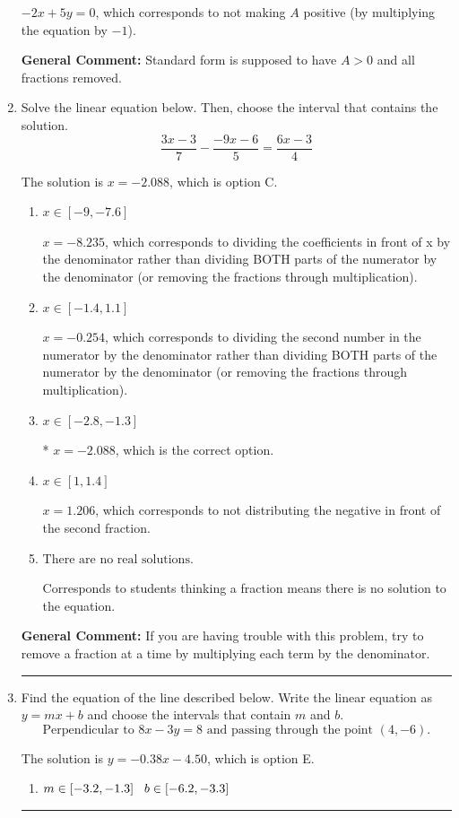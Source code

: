 \documentclass{extbook}[14pt]
\newcommand{\litem}[1]{\item #1

\rule{\textwidth}{0.4pt}}
\begin{document}
\begin{enumerate}
{\begin{enumerate}[label=\Alph*.]
 $-2x + 5y = 0$, which corresponds to not making $A$ positive (by multiplying the equation by $-1$).
\end{enumerate}

\textbf{General Comment:} Standard form is supposed to have $A > 0$ and all fractions removed.
}
\litem{
Solve the linear equation below. Then, choose the interval that contains the solution.
\[ \frac{3x -3}{7} - \frac{-9x -6}{5} = \frac{6x -3}{4} \]

The solution is \( x = -2.088 \), which is option C.\begin{enumerate}[label=\Alph*.]
\item \( x \in [-9, -7.6] \)

 $x = -8.235$, which corresponds to dividing the coefficients in front of x by the denominator rather than dividing BOTH parts of the numerator by the denominator (or removing the fractions through multiplication).
\item \( x \in [-1.4, 1.1] \)

 $x = -0.254$, which corresponds to dividing the second number in the numerator by the denominator rather than dividing BOTH parts of the numerator by the denominator (or removing the fractions through multiplication).
\item \( x \in [-2.8, -1.3] \)

* $x = -2.088$, which is the correct option.
\item \( x \in [1, 1.4] \)

 $x = 1.206$, which corresponds to not distributing the negative in front of the second fraction.
\item \( \text{There are no real solutions.} \)

Corresponds to students thinking a fraction means there is no solution to the equation.
\end{enumerate}

\textbf{General Comment:} If you are having trouble with this problem, try to remove a fraction at a time by multiplying each term by the denominator.
}
\litem{
Find the equation of the line described below. Write the linear equation as $ y=mx+b $ and choose the intervals that contain $m$ and $b$.
\[ \text{Perpendicular to } 8 x - 3 y = 8 \text{ and passing through the point } (4, -6). \]

The solution is \( y = -0.38x - 4.50 \), which is option E.\begin{enumerate}[label=\Alph*.]
\item \( m \in [-3.2, -1.3] \hspace*{3mm} b \in [-6.2, -3.3] \)


\end{enumerate}}
\end{enumerate}
\end{document}
